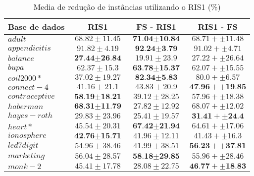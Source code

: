 \documentclass[a4paper, 12pt]{article}
\begin{document}
\begin{table}[h!]
  \begin{center}
    \caption{Media de redução de instâncias utilizando o RIS1 (\%)}
    \label{tab:table2}
    \begin{tabular}{l|c|c|c}
      \textbf{Base de dados} & \textbf{ RIS1 } & \textbf{FS - RIS1} & \textbf{RIS1 - FS}\\
        \hline
        $adult$ & $68.82 \pm 11.45$  & $\textbf{71.04} \pm \textbf{10.84}$ & $68.71 +  \pm 11.48$ \\
        \hline
        $appendicitis$ & $91.82 \pm 4.19$  & $\textbf{92.24} \pm \textbf{3.79}$ & $91.02 +  \pm 4.71$ \\
        \hline
        $balance$ & $\textbf{27.44} \pm \textbf{26.84}$  & $19.91 \pm 23.9$ & $27.22 +  \pm 26.64$ \\
        \hline
        $bupa$ & $62.37 \pm 15.3$  & $\textbf{63.78} \pm \textbf{15.37}$ & $62.07 +  \pm 15.55$ \\
        \hline
        $coil2000*$ & $37.02 \pm 19.27$  & $\textbf{82.34} \pm \textbf{5.83}$ & $80.0 +  \pm 6.57$ \\
        \hline
        $connect-4$ & $41.16 \pm 21.1$  & $43.83 \pm 20.9$ & $\textbf{47.96} +  \pm \textbf{19.85}$ \\
        \hline
        $contraceptive$ & $\textbf{58.19} \pm \textbf{18.21}$  & $39.12 \pm 28.25$ & $57.96 +  \pm 18.38$ \\
        \hline
        $haberman$ & $\textbf{68.31} \pm \textbf{11.79}$  & $27.82 \pm 12.92$ & $68.07 +  \pm 12.02$ \\
        \hline
        $hayes-roth$ & $29.83 \pm 23.96$  & $25.41 \pm 19.57$ & $\textbf{31.41} +  \pm \textbf{24.4}$ \\
        \hline
        $heart*$ & $45.54 \pm 20.31$  & $\textbf{67.42} \pm \textbf{21.94}$ & $64.61 +  \pm 17.06$ \\
        \hline
        $ionosphere$ & $\textbf{42.76} \pm \textbf{15.71}$  & $41.96 \pm 12.11$ & $41.43 +  \pm 16.3$ \\
        \hline
        $led7digit$ & $54.96 \pm 38.46$  & $41.99 \pm 38.51$ & $\textbf{56.23} +  \pm \textbf{37.81}$ \\
        \hline
        $marketing$ & $56.04 \pm 28.57$  & $\textbf{58.18} \pm \textbf{29.85}$ & $55.96 +  \pm 28.46$ \\
        \hline
        $monk-2$ & $45.41 \pm 17.78$  & $28.08 \pm 22.75$ & $\textbf{46.77} +  \pm \textbf{18.83}$ \\

\end{tabular}
\end{center}
\end{table}
\end{document}
